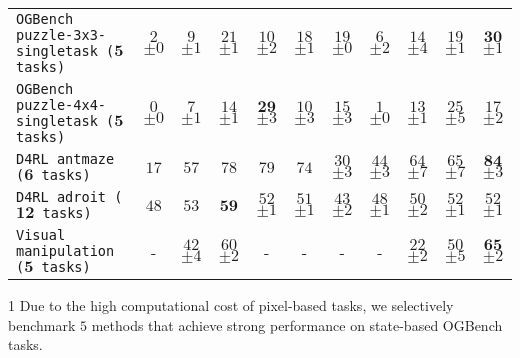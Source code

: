\begin{table*}[t!]
{\begin{threeparttable}
\begin{tabular}{lcccccccccc}
\texttt{OGBench puzzle-3x3-singletask ($\mathbf{5}$ tasks)} & $2$ {\tiny $\pm 0$} & $9$ {\tiny $\pm 1$} & $21$ {\tiny $\pm 1$} & $10$ {\tiny $\pm 2$} & $18$ {\tiny $\pm 1$} & $19$ {\tiny $\pm 0$} & $6$ {\tiny $\pm 2$} & $14$ {\tiny $\pm 4$} & $19$ {\tiny $\pm 1$} & $\mathbf{30}$ {\tiny $\pm 1$} \\
\texttt{OGBench puzzle-4x4-singletask ($\mathbf{5}$ tasks)} & $0$ {\tiny $\pm 0$} & $7$ {\tiny $\pm 1$} & $14$ {\tiny $\pm 1$} & $\mathbf{29}$ {\tiny $\pm 3$} & $10$ {\tiny $\pm 3$} & $15$ {\tiny $\pm 3$} & $1$ {\tiny $\pm 0$} & $13$ {\tiny $\pm 1$} & $25$ {\tiny $\pm 5$} & $17$ {\tiny $\pm 2$} \\
\texttt{D4RL antmaze ($\mathbf{6}$ tasks)} & $17$ & $57$ & $78$ & $79$ & $74$ & $30$ {\tiny $\pm 3$} & $44$ {\tiny $\pm 3$} & $64$ {\tiny $\pm 7$} & $65$ {\tiny $\pm 7$} & $\mathbf{84}$ {\tiny $\pm 3$} \\
\texttt{D4RL adroit ($\mathbf{12}$ tasks)} & $48$ & $53$ & $\mathbf{59}$ & $52$ {\tiny $\pm 1$} & $51$ {\tiny $\pm 1$} & $43$ {\tiny $\pm 2$} & $48$ {\tiny $\pm 1$} & $50$ {\tiny $\pm 2$} & $52$ {\tiny $\pm 1$} & $52$ {\tiny $\pm 1$} \\
\texttt{Visual manipulation ($\mathbf{5}$ tasks)} & - & $42$ {\tiny $\pm 4$} & $60$ {\tiny $\pm 2$} & - & - & - & - & $22$ {\tiny $\pm 2$} & $50$ {\tiny $\pm 5$} & $\mathbf{65}$ {\tiny $\pm 2$} \\



\bottomrule
\end{tabular}
\begin{tablenotes}
\item[1] Due to the high computational cost of pixel-based tasks,
we selectively benchmark $5$ methods that achieve strong performance on state-based OGBench tasks.
\end{tablenotes}
\end{threeparttable}
}
%
\end{table*}